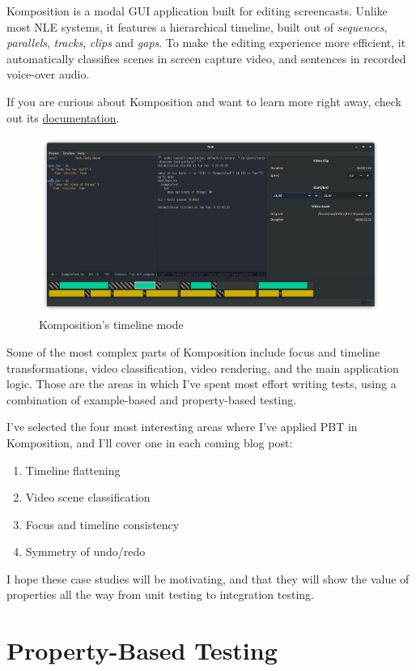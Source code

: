 Komposition is a modal GUI application built for editing screencasts. Unlike most NLE systems, it features a hierarchical timeline, built out of \textit{sequences}, \textit{parallels}, \textit{tracks}, \textit{clips} and \textit{gaps}. To make the editing experience more efficient, it automatically classifies scenes in screen capture video, and sentences in recorded voice-over audio.

If you are curious about Komposition and want to learn more right away, check out its \href{https://owickstrom.github.io/komposition/}{documentation}.
\begin{figure}[htbp]
 \centering
 \includegraphics[width=.95\linewidth]{./pics/komposition-light.png}
 \caption{Komposition's timeline mode}
 \label{fig:komposition_time_line_mode}
\end{figure}
Some of the most complex parts of Komposition include focus and timeline transformations, video classification, video rendering, and the main application logic. Those are the areas in which I've spent most effort writing tests, using a combination of example-based and property-based testing.

I've selected the four most interesting areas where I've applied PBT in Komposition, and I'll cover one in each coming blog post:

\begin{enumerate}
\item Timeline flattening
\item Video scene classification
\item Focus and timeline consistency
\item Symmetry of undo/redo
\end{enumerate}
I hope these case studies will be motivating, and that they will show the value of properties all the way from unit testing to integration testing.

\section{Property-Based Testing}


